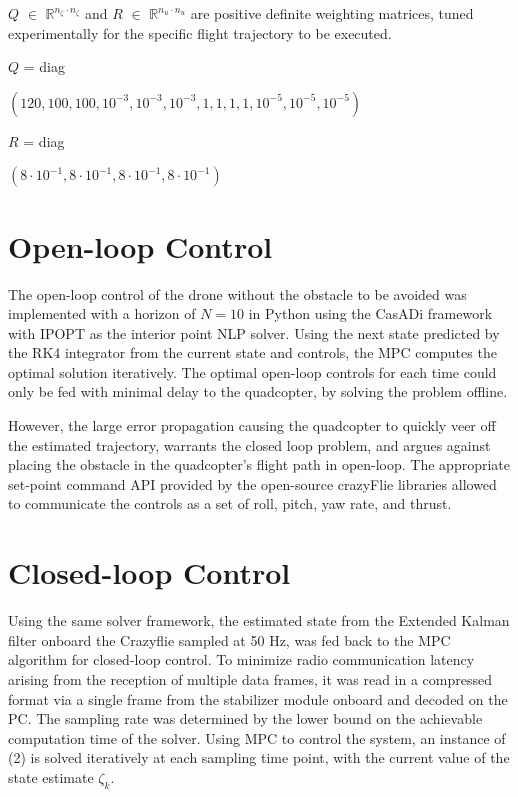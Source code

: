 \documentclass[conference]{IEEEtran}
\begin{document}
 $Q$ $\in$ $\mathbb{R}^{n_{\zeta} \cdot n_{\zeta}}$ and $R$ $\in$ $\mathbb{R}^{n_{u} \cdot n_{u}}$ are positive definite weighting matrices, tuned experimentally for the specific flight trajectory to be executed.
\begin{flushleft}
\begin{small}
$Q$ = diag\begin{footnotesize}$(120, 100, 100, 10^{-3}, 10^{-3},10^{-3},1, 1, 1, 1, 10^{-5}, 10^{-5}, 10^{-5})$\\
\end{footnotesize}
$R$ = diag\begin{footnotesize}$(8 \cdot 10^{-1}, 8\cdot 10^{-1}, 8\cdot 10^{-1}, 8\cdot 10^{-1})$\\
\end{footnotesize}
\end{small}
\end{flushleft}

\section{Open-loop Control }\label{Section4}
The open-loop control of the drone without the obstacle to be avoided was implemented with a horizon of $N = 10$ in Python using the CasADi \cite{andersson_casadi_2019} framework with IPOPT \cite{wachter_implementation_2006} as the interior point NLP solver. Using the next state predicted by the RK4 integrator from the current state and controls, the MPC computes the optimal solution iteratively. The optimal open-loop controls for each time could only be fed with minimal delay to the quadcopter, by solving the problem offline. 


However, the large error propagation causing the quadcopter to quickly veer off the estimated trajectory, warrants the closed loop problem, and argues against placing the obstacle in the quadcopter's flight path in open-loop.
The appropriate set-point command API provided by the open-source crazyFlie libraries allowed to communicate the controls as a set of roll, pitch, yaw rate, and thrust. 

\section{Closed-loop Control }\label{Section5}
Using the same solver framework, the estimated state from the Extended Kalman filter onboard the Crazyflie sampled at 50 Hz, was fed back to the MPC algorithm for closed-loop control. To minimize radio communication latency arising from the reception of multiple data frames, it was read in a compressed format via a single frame from the stabilizer module onboard and decoded on the PC. The sampling rate was determined by the lower bound on the achievable computation time of the solver. Using MPC to control the system, an instance of (2) is solved iteratively at each sampling time point, with the current value of the state estimate $\zeta_k$. 
\end{document}
